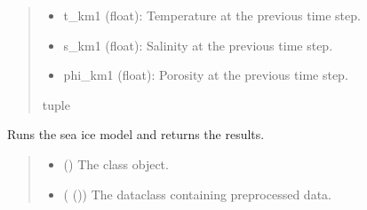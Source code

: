 \documentclass[a4paper,11pt,english,openany]{sphinxmanual}
\begin{document}
\begin{fulllineitems}
\begin{fulllineitems}
\begin{quote}
\begin{description}
\begin{description}
\begin{itemize}
\item {} 
\sphinxAtStartPar
t\_km1 (float): Temperature at the previous time step.

\item {} 
\sphinxAtStartPar
s\_km1 (float): Salinity at the previous time step.

\item {} 
\sphinxAtStartPar
phi\_km1 (float): Porosity at the previous time step.

\end{itemize}

\end{description}


\sphinxAtStartPar
tuple

\end{description}\end{quote}

\end{fulllineitems}


\begin{fulllineitems}
\label{\detokenize{api/spyice.models.sea_ice_model:spyice.models.sea_ice_model.SeaIceModel.get_results}}
\pysigstartsignatures
{}
\pysigstopsignatures
\sphinxAtStartPar
Runs the sea ice model and returns the results.
\begin{quote}\begin{description}
\begin{itemize}
\item {} 
\sphinxAtStartPar
{} () \textendash{} The class object.

\item {} 
\sphinxAtStartPar
{} ({\hyperref[\detokenize{api/spyice.preprocess.pre_process:spyice.preprocess.pre_process.PreprocessData}]{}} ()) \textendash{} The dataclass containing preprocessed data.


\end{itemize}
\end{description}
\end{quote}
\end{fulllineitems}
\end{fulllineitems}
\end{document}
